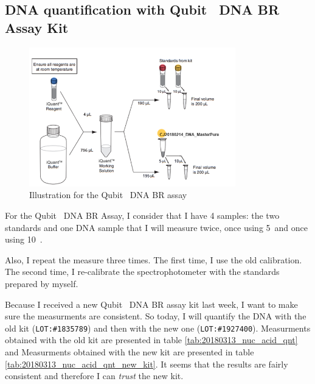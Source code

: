 \subsection{DNA quantification with Qubit\texttrademark~ DNA BR Assay Kit}
\label{task:20180313_cj1}


\begin{figure}[H] %
    \centering
    \caption{Illustration for the Qubit\texttrademark~ DNA BR assay}
    \label{fig:20180313_Qubit_dsDNA_BR}
    \includegraphics[width=0.8\textwidth]{graphics/schemas/20180215_Qubit_dsDNA_BR.png}
\end{figure}

For the Qubit\texttrademark~ DNA BR Assay, I consider that I have 4 samples: the two standards and one DNA sample that I will measure twice, once using 5~\uL and once using 10~\uL.

Also, I repeat the measure three times. The first time, I use the old calibration. The second time, I re-calibrate the spectrophotometer with the standards prepared by myself.

Because I received a new Qubit\texttrademark~ DNA BR assay kit last week, I want to make sure the measurments are consistent. So today, I will quantify the DNA with the old kit (\texttt{LOT:\#1835789}) and then with the new one (\texttt{LOT:\#1927400}). Measurments obtained with the old kit are presented in table \ref{tab:20180313_nuc_acid_qnt} and  Measurments obtained with the new kit are presented in table \ref{tab:20180313_nuc_acid_qnt_new_kit}. It seems that the results are fairly consistent and therefore I can \textit{trust} the new kit. 

